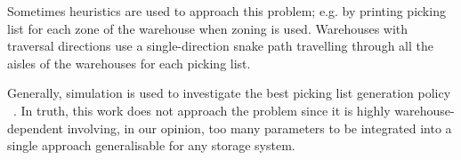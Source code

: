 Sometimes heuristics are used to approach this problem; e.g. by printing picking list for each zone of the warehouse when zoning is used. Warehouses with traversal directions use a single-direction snake path travelling through all the aisles of the warehouses for each picking list.\par

Generally, simulation is used to investigate the best picking list generation policy ~\cite{Chew1999, Hall1993, Kim2002, Petersen1999}. In truth, this work does not approach the problem since it is highly warehouse-dependent involving, in our opinion, too many parameters to be integrated into a single approach generalisable for any storage system.




